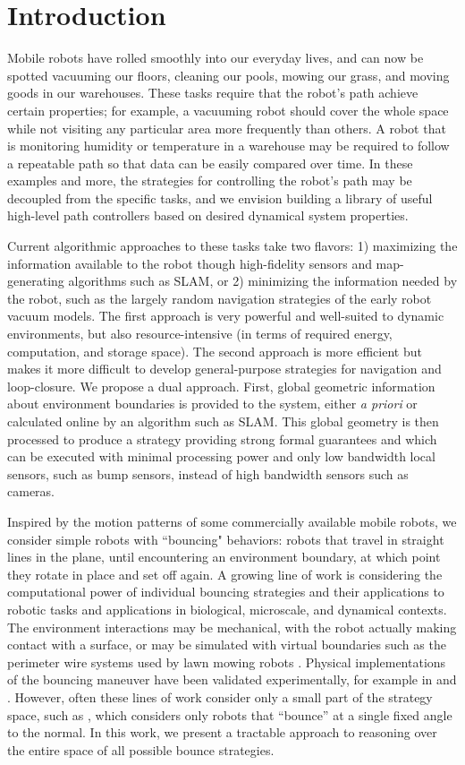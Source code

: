 \documentclass[]{styles/svproc}  %
\begin{document}
\section{Introduction}

Mobile robots have rolled smoothly into our everyday lives, and can now be
spotted vacuuming our floors, cleaning our pools, mowing our grass, and moving
goods in our warehouses. These tasks require that the robot's path achieve certain properties; for example, a 
vacuuming robot should cover the whole space while not visiting 
any particular area more frequently than others. A robot that is monitoring
humidity or temperature in a warehouse may be
required to follow a repeatable path so that data can be easily compared 
over time. In these examples and more, the strategies for controlling the robot's
path may be decoupled from the specific tasks, and we envision building a
library of useful high-level path controllers based on desired dynamical system
properties.

Current algorithmic approaches to these tasks take two flavors: 1)
maximizing the information available to the robot though high-fidelity sensors
and map-generating algorithms such as SLAM, or 2) minimizing the information needed
by the robot, such as the largely random navigation strategies of the early
robot vacuum models. The first approach is very powerful and well-suited to 
dynamic environments, but also
resource-intensive (in terms of required energy, computation, and storage
space). The second approach 
is more efficient but makes it more difficult to develop general-purpose strategies 
for navigation and loop-closure. We propose a dual
approach. First, global geometric information about environment boundaries is provided 
to the system, either \emph{a priori} or calculated online by
an algorithm such as SLAM. This global geometry is then processed to produce
a strategy providing strong formal guarantees and which can be executed with minimal 
processing power and only low bandwidth local sensors, such as bump sensors,
instead of high bandwidth sensors such as cameras.

Inspired by the motion patterns of some commercially available mobile robots, 
we consider simple robots with ``bouncing" behaviors: robots that
travel in straight lines in the plane, until encountering an environment
boundary, at which point they rotate in place and set off again. 
A growing line of work is considering the computational power of individual bouncing strategies
and their applications to robotic tasks and applications in biological, microscale, 
and dynamical contexts. The environment interactions may be mechanical,
with the robot actually making contact with a surface, or may be simulated with
virtual boundaries such as the perimeter wire systems used by lawn mowing robots
\cite{sahin2007household}. Physical implementations of the bouncing maneuver have
been validated experimentally, for example in \cite{alam2018space} and \cite{LewOKa13}. 
However, often these lines of work consider only a small
part of the strategy space, such as \cite{ErLav13}, which considers only robots
that ``bounce'' at a single fixed angle to the normal. In this work, we present 
a tractable approach to reasoning over the entire
 space of all possible bounce strategies.
\end{document}
